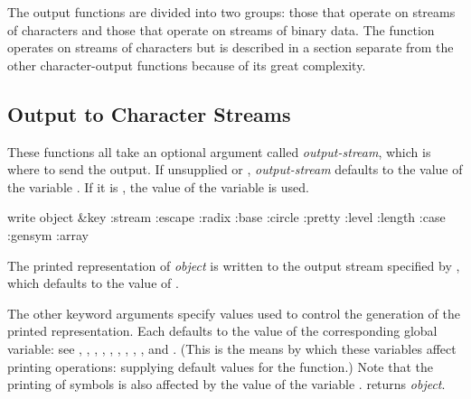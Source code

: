 The output functions are divided into two groups: those that
operate on streams of characters and those that operate on
streams of binary data.  The function  operates
on streams of characters but is described in a section
separate from the other character-output functions
because of its great complexity.

\subsection {Output to Character Streams}

These functions all take an optional argument called {\it output-stream},
which is where to send the output.  If unsupplied or {\false}, {\it output-stream}
defaults to the value of the variable
.  If it is {\true}, the value of the variable
 is used.

\begin{obsolete}
\begin{defun}[Function]
write object &key :stream :escape :radix :base :circle :pretty :level :length :case :gensym :array

The printed representation of {\it object} is written to the output stream
specified by , which defaults to the value of .

The other keyword arguments specify values used to control the
generation of the printed representation.  Each defaults to the
value of the corresponding global variable: see ,
, , , ,
, ,
,
,
and .
(This is the means by which these variables affect printing operations:
supplying default values for the  function.)
Note that the printing of symbols is also affected by the value
of the variable .
 returns {\it object}.
\end{defun}
\end{obsolete}

